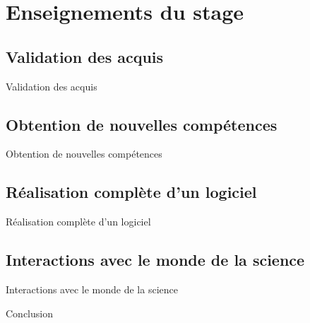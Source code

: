 \documentclass[compress]{beamer}
\newenvironment{tframe}[1]{
  \subsection{#1}
  \begin{frame}{#1}
  }{
  \end{frame}
  }
\begin{document}
\section{Enseignements du stage}

\begin{tframe}{Validation des acquis}
\end{tframe}
\begin{tframe}{Obtention de nouvelles compétences}
\end{tframe}
\begin{tframe}{Réalisation complète d'un logiciel}
\end{tframe}
\begin{tframe}{Interactions avec le monde de la science}
\end{tframe}

\begin{frame}{Conclusion}
\end{frame}
\end{document}
